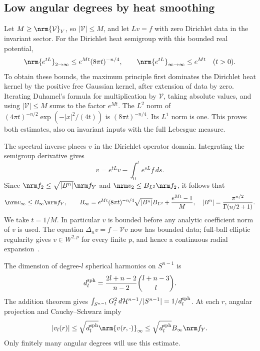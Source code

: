 \subsection{Low angular degrees by heat smoothing}\label{gd:sec:heat}
Let $M\ge\nrm{\mathcal V}_Y$, so $|\mathcal V|\le M$, and let $Lv=f$
with zero Dirichlet data in the invariant sector.
For the Dirichlet heat semigroup with this bounded real potential,
\begin{equation}\label{gd:eq:heat}
 \nrm{e^{tL}}_{2\to\infty}\le e^{Mt}(8\pi t)^{-n/4},
 \qquad
 \nrm{e^{tL}}_{\infty\to\infty}\le e^{Mt}\quad(t>0).
\end{equation}
To obtain these bounds, the maximum principle first dominates the
Dirichlet heat kernel by the positive free Gaussian kernel, after
extension of data by zero. Iterating Duhamel's formula for multiplication
by $\mathcal V$, taking absolute values, and using $|\mathcal V|\le M$
sums to the factor $e^{Mt}$.
The $L^2$ norm of
$(4\pi t)^{-n/2}\exp(-|x|^2/(4t))$ is $(8\pi t)^{-n/4}$.
Its $L^1$ norm is one. This proves both estimates, also on invariant
inputs with the full Lebesgue measure.

The spectral inverse places $v$ in the Dirichlet operator domain.
Integrating the semigroup derivative gives
\[
 v=e^{tL}v-\int_0^t e^{sL}f\,ds .
\]
Since $\nrm f_2\le\sqrt{|B^n|}\nrm f_Y$ and
$\nrm v_2\le B_{L^2}\nrm f_2$, it follows that
\begin{equation}\label{gd:eq:Bsup}
 \nrm v_\infty\le B_\infty\nrm f_Y,\qquad
 B_\infty=e^{Mt}(8\pi t)^{-n/4}\sqrt{|B^n|}B_{L^2}
                    +\frac{e^{Mt}-1}{M},
 \quad |B^n|=\frac{\pi^{n/2}}{\Gamma(n/2+1)}.
\end{equation}
We take $t=1/M$. In particular $v$ is bounded before any analytic
coefficient norm of $v$ is used.
The equation $\Delta_n v=f-\mathcal Vv$ now has bounded data;
full-ball elliptic regularity gives $v\in W^{2,p}$ for every finite $p$,
and hence a continuous radial expansion~\cite{GT01}.

The dimension of degree-$l$ spherical harmonics on $S^{n-1}$ is
\[
 d_l^{\rm sph}=\frac{2l+n-2}{n-2}\binom{l+n-3}{l}.
\]
The addition theorem gives
$\int_{S^{n-1}}G_l^2\,d\mathcal H^{n-1}/|S^{n-1}|=1/d_l^{\rm sph}$.
At each $r$, angular projection and Cauchy--Schwarz imply
\begin{equation}\label{gd:eq:low-angular}
 |v_l(r)|\le\sqrt{d_l^{\rm sph}}\nrm{v(r,\cdot)}_\infty
                 \le\sqrt{d_l^{\rm sph}}B_\infty\nrm f_Y .
\end{equation}
Only finitely many angular degrees will use this estimate.

